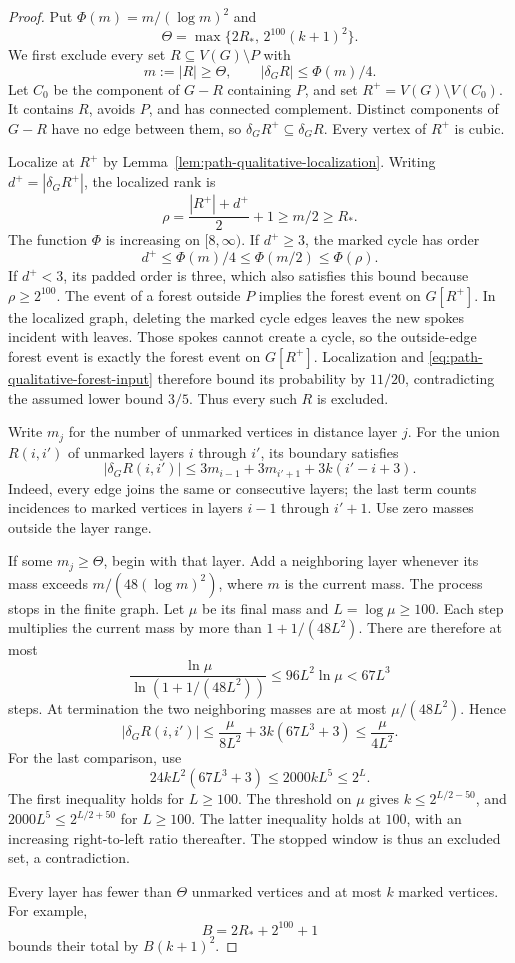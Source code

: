 \begin{proof}
Put $\Phi(m)=m/(\log m)^2$ and
\[
 \Theta=\max\{2R_*,\,2^{100}(k+1)^2\}.
\]
We first exclude every set $R\subseteq V(G)\setminus P$ with
\[
 m:=|R|\ge\Theta,
 \qquad |\delta_G R|\le\Phi(m)/4.
\]
Let $C_0$ be the component of $G-R$ containing $P$, and set
$R^+=V(G)\setminus V(C_0)$.
It contains $R$, avoids $P$, and has connected complement.
Distinct components of $G-R$ have no edge between them, so
$\delta_G R^+\subseteq\delta_G R$.
Every vertex of $R^+$ is cubic.

Localize at $R^+$ by Lemma~\ref{lem:path-qualitative-localization}.
Writing $d^+=|\delta_G R^+|$, the localized rank is
\[
 \rho=\frac{|R^+|+d^+}{2}+1\ge m/2\ge R_*.
\]
The function $\Phi$ is increasing on $[8,\infty)$.
If $d^+\ge3$, the marked cycle has order
\[
 d^+\le\Phi(m)/4\le\Phi(m/2)\le\Phi(\rho).
\]
If $d^+<3$, its padded order is three, which also satisfies this bound because $\rho\ge2^{100}$.
The event of a forest outside $P$ implies the forest event on $G[R^+]$.
In the localized graph, deleting the marked cycle edges leaves the new spokes incident with leaves.
Those spokes cannot create a cycle, so the outside-edge forest event is exactly the forest event on $G[R^+]$.
Localization and \eqref{eq:path-qualitative-forest-input} therefore bound its probability by $11/20$, contradicting the assumed lower bound $3/5$.
Thus every such $R$ is excluded.

Write $m_j$ for the number of unmarked vertices in distance layer $j$.
For the union $R(i,i')$ of unmarked layers $i$ through $i'$, its boundary satisfies
\[
 |\delta_G R(i,i')|
 \le3m_{i-1}+3m_{i'+1}+3k(i'-i+3).
\]
Indeed, every edge joins the same or consecutive layers; the last term counts incidences to marked vertices in layers $i-1$ through $i'+1$.
Use zero masses outside the layer range.

If some $m_j\ge\Theta$, begin with that layer.
Add a neighboring layer whenever its mass exceeds $m/(48(\log m)^2)$, where $m$ is the current mass.
The process stops in the finite graph.
Let $\mu$ be its final mass and $L=\log\mu\ge100$.
Each step multiplies the current mass by more than $1+1/(48L^2)$.
There are therefore at most
\[
 \frac{\ln\mu}{\ln(1+1/(48L^2))}
 \le96L^2\ln\mu<67L^3
\]
steps.
At termination the two neighboring masses are at most $\mu/(48L^2)$.
Hence
\[
 |\delta_G R(i,i')|
 \le\frac{\mu}{8L^2}+3k(67L^3+3)
 \le\frac{\mu}{4L^2}.
\]
For the last comparison, use
\[
 24kL^2(67L^3+3)\le2000kL^5\le2^L.
\]
The first inequality holds for $L\ge100$.
The threshold on $\mu$ gives $k\le2^{L/2-50}$, and
$2000L^5\le2^{L/2+50}$ for $L\ge100$.
The latter inequality holds at $100$, with an increasing right-to-left ratio thereafter.
The stopped window is thus an excluded set, a contradiction.

Every layer has fewer than $\Theta$ unmarked vertices and at most $k$ marked vertices.
For example,
\[
 B=2R_*+2^{100}+1
\]
bounds their total by $B(k+1)^2$.
\end{proof}

